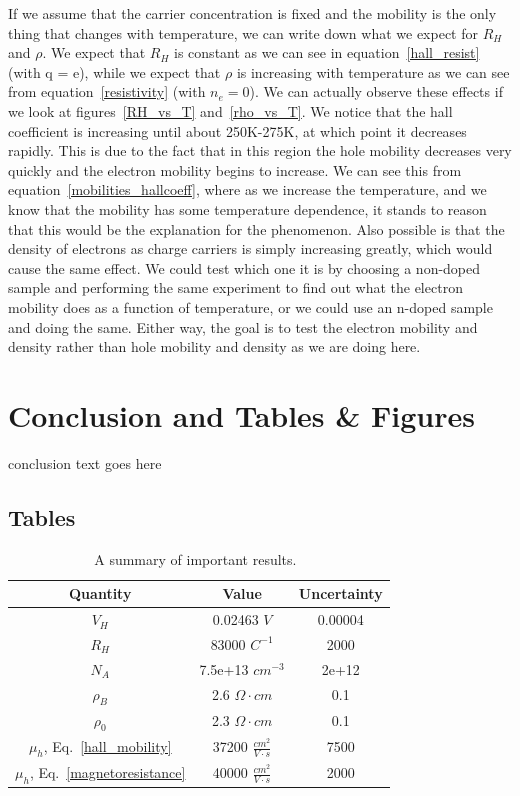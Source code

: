 \documentclass[reprint, nobibnotes, amssymb, amsmath, amsfonts, physics, mathtools, mathrsfs, floatfix]{revtex4-1}
\begin{document}
    If we assume that the carrier concentration is fixed and the mobility is the only thing that changes with temperature, we can write down what we expect for $R_H$ and $\rho$.  We expect that $R_H$ is constant as we can see in equation~\ref{hall_resist} (with q = e), while we expect that $\rho$ is increasing with temperature as we can see from equation~\ref{resistivity} (with $n_e = 0$).  We can actually observe these effects if we look at figures~\ref{RH_vs_T} and~\ref{rho_vs_T}.  We notice that the hall coefficient is increasing until about 250K-275K, at which point it decreases rapidly.  This is due to the fact that in this region the hole mobility decreases very quickly and the electron mobility begins to increase.  We can see this from equation~\ref{mobilities_hallcoeff}, where as we increase the temperature, and we know that the mobility has some temperature dependence, it stands to reason that this would be the explanation for the phenomenon.  Also possible is that the density of electrons as charge carriers is simply increasing greatly, which would cause the same effect.  We could test which one it is by choosing a non-doped sample and performing the same experiment to find out what the electron mobility does as a function of temperature, or we could use an n-doped sample and doing the same.  Either way, the goal is to test the electron mobility and density rather than hole mobility and density as we are doing here.

    \section{Conclusion and Tables \& Figures}

    conclusion text goes here

    \subsection{Tables}

    \begin{table}[h]
      \begin{tabular}{|c|c|c|}
        \hline
        Quantity & Value & Uncertainty \\ \hline
        $V_H$ & 0.02463 $V$ & 0.00004 \\ \hline
        $R_H$ & 83000 $C^{-1}$ & 2000 \\ \hline
        $N_A$ &  7.5e+13 $cm^{-3}$ & 2e+12 \\ \hline
        $\rho_B$ & 2.6 $\Omega \cdot cm$ & 0.1 \\ \hline
        $\rho_0$ & 2.3 $\Omega \cdot cm$ & 0.1 \\ \hline
        $\mu_h$, Eq.~\ref{hall_mobility} & 37200 $\frac{cm^2}{V\cdot s}$ & 7500 \\ \hline
        $\mu_h$, Eq.~\ref{magnetoresistance} & 40000 $\frac{cm^2}{V\cdot s}$ & 2000 \\ \hline
      \end{tabular}
      \caption{A summary of important results.~\label{tab:results}}
    \end{table}
\end{document}
